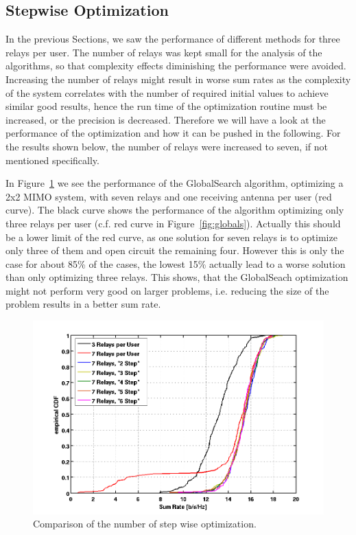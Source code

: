 \subsection{Stepwise Optimization}
\label{sec:stepwise}
In the previous Sections, we saw the performance of different methods for three relays per user.
The number of relays was kept small for the analysis of the algorithms, so that complexity effects diminishing the performance were avoided.
Increasing the number of relays might result in worse sum rates as the complexity of the system correlates with the number of required initial values to achieve similar good results, hence the run time of the optimization routine must be increased, or the precision is decreased.
Therefore we will have a look at the performance of the optimization and how it can be pushed in the following.
For the results shown below, the number of relays were increased to seven, if not mentioned specifically.

In Figure~\ref{fig:nrel7} we see the performance of the GlobalSearch algorithm, optimizing a 2x2 MIMO system, with seven relays and one receiving antenna per user (red curve).
The black curve shows the performance of the algorithm optimizing only three relays per user (c.f.  red curve in Figure~\ref{fig:globals}).
Actually this should be a lower limit of the red curve, as one solution for seven relays is to optimize only three of them and open circuit the remaining four.
However this is only the case for about 85\% of the cases, the lowest 15\% actually lead to a worse solution than only optimizing three relays.
This shows, that the GlobalSeach optimization might not perform very good on larger problems, i.e. reducing the size of the problem results in a better sum rate.

\begin{figure}[h]
\centering
  \includegraphics[width=0.9\linewidth]{images/Relstepcomparison_edited.png}
\caption{Comparison of the number of step wise optimization.}
\label{fig:nrel7}
\end{figure}

